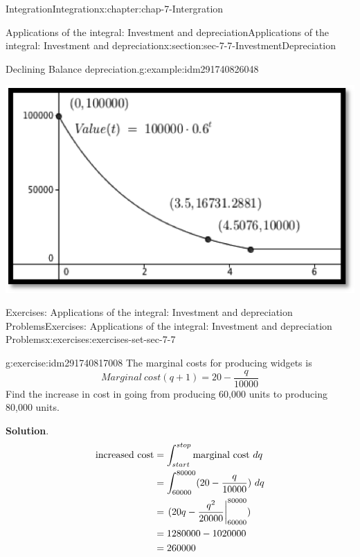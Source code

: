 \documentclass[oneside,10pt,]{book}
\numberwithin{equation}{section}
\newcommand{\amp}{&}
\begin{document}
\begin{chapterptx}{Integration}{}{Integration}{}{}{x:chapter:chap-7-Intergration}
\begin{sectionptx}{Applications of the integral: Investment and depreciation}{}{Applications of the integral: Investment and depreciation}{}{}{x:section:sec-7-7-InvestmentDepreciation}
\begin{example}{Declining Balance depreciation.}{g:example:idm291740826048}
\begin{sidebyside}{1}{0.2}{0.2}{0}
\begin{sbspanel}{0.6}%
\includegraphics[width=\linewidth]{images/sec7-7-8.png}
\end{sbspanel}%
\end{sidebyside}%
\end{example}
%
%
\typeout{************************************************}
\typeout{************************************************}
%
\begin{exercises-subsection}{Exercises: Applications of the integral: Investment and depreciation Problems}{}{Exercises: Applications of the integral: Investment and depreciation Problems}{}{}{x:exercises:exercises-set-sec-7-7}
\begin{divisionexercise}{1}{}{}{g:exercise:idm291740817008}%
The marginal costs for producing widgets is%
%
\begin{equation*}
Marginal\ cost(q+1)=20-\frac{q}{10000}
\end{equation*}
Find the increase in cost in going from producing 60,000 units to producing 80,000 units.%
\par\smallskip%
\noindent\textbf{Solution}.\hypertarget{g:solution:idm291740815504}{}\quad{}%
\begin{align*}
\hbox{increased cost}\amp=\int_{start}^{stop}\hbox{marginal cost}\ dq\\
\amp=\int_{60000}^{80000}(20-\frac{q}{10000})\ dq\\
\amp=\left.(20q-\frac{q^2}{20000}\right|_{60000}^{80000})\ \\
\amp=1280000-1020000\\
\amp=260000
\end{align*}
\end{divisionexercise}%

\end{exercises-subsection}
\end{sectionptx}
\end{chapterptx}
\end{document}
